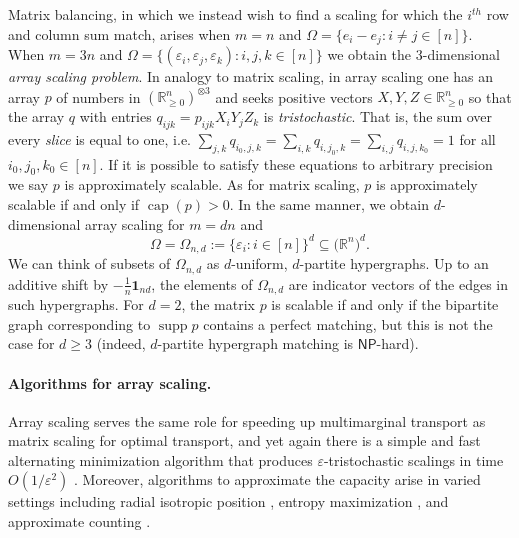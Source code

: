 \documentclass[10pt,a4paper]{article}
\providecommand{\NP}{\mathsf{NP}}
\numberwithin{equation}{section}
\DeclareMathOperator{\capa}{cap}
\DeclareMathOperator{\supp}{supp}
\newcommand{\RR}{\mathbb R}
\newcommand{\ot}{\otimes}
\newcommand{\eps}{\varepsilon}
\newcommand{\id}{\mathbf{1}}
\begin{document}
Matrix balancing, in which we instead wish to find a scaling for which the $i^{th}$ row and column sum match, arises when $m = n$ and $\Omega = \{e_i - e_j: i\neq j \in [n]\}$. When $m = 3n$ and $\Omega = \{(\eps_i, \eps_j, \eps_k): i,j,k \in [n]\}$ we obtain the $3$-dimensional \emph{array scaling problem}. In analogy to matrix scaling, in array scaling one has an array $p$ of numbers in $(\RR^n_{\geq 0})^{\ot 3}$ and seeks positive vectors $X,Y,Z \in \RR^n_{\geq 0}$ so that the array $q$ with entries $q_{ijk} =p_{ijk}X_i Y_j Z_k$ is \emph{tristochastic}. That is, the sum over every \emph{slice} is equal to one, i.e.
    $\sum_{j,k} q_{i_0,j,k} = \sum_{i,k} q_{i,j_0,k} = \sum_{i,j} q_{i,j,k_0} = 1$
for all $i_0,j_0,k_0 \in [n]$. If it is possible to satisfy these equations to arbitrary precision we say $p$ is approximately scalable. As for matrix scaling, $p$ is approximately scalable if and only if $\capa(p) > 0$. In the same manner, we obtain $d$-dimensional array scaling for $m=dn$ and
	\begin{equation}\label{eq:defnOmega-n-d}
	\Omega = \Omega_{n,d} := \big\lbrace \eps_i \colon i \in [n] \big\rbrace^d \subseteq \big( \RR^n \big)^d.
	\end{equation}
We can think of subsets of $\Omega_{n,d}$ as $d$-uniform, $d$-partite hypergraphs. Up to an additive shift by $- \frac{1}{n} \id_{nd}$, the elements of $\Omega_{n,d}$ are indicator vectors of the edges in such hypergraphs. For $d = 2$, the matrix $p$ is scalable if and only if the bipartite graph corresponding to $\supp p$ contains a perfect matching, but this is not the case for $d \geq 3$ (indeed, $d$-partite hypergraph matching is $\NP$-hard).



\paragraph{Algorithms for array scaling.}

Array scaling serves the same role for speeding up multimarginal transport as matrix scaling for optimal transport, and yet again there is a simple and fast alternating minimization algorithm that produces $\eps$-tristochastic scalings in time $O(1/\eps^2)$ \cite{altschuler2020polynomial,lin2019complexity}.
Moreover, algorithms to approximate the capacity arise in varied settings including radial isotropic position \cite{hardt2013algorithms}, entropy maximization \cite{straszak2017computing}, and approximate counting \cite{anari2018log}.  
 
\end{document}
